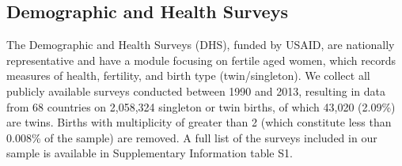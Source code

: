 \documentclass{nature}
\begin{document}
\begin{linenumbers}
\subsection{Demographic and Health Surveys}
The Demographic and Health Surveys (DHS), funded by USAID, are nationally representative and have a module focusing on fertile aged women, which records measures of health, fertility, and birth type (twin/singleton).  We collect all publicly available surveys conducted between 1990 and 2013, resulting in data from 68 countries on 2,058,324 singleton or twin births, of which 43,020 (2.09\%) are twins.  Births with multiplicity of greater than 2 (which constitute less than 0.008\% of the sample) are removed.  A full list of the surveys included in our sample is available in Supplementary Information table S1.




\end{linenumbers}
\end{document}
